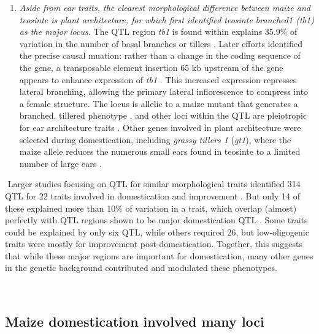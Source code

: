 \documentclass[9pt,twocolumn,twoside]{rilabRxiv}
\begin{document}
\begin{enumerate}
﻿ \item \textit{Aside from ear traits, the clearest morphological difference between maize and teosinte is plant architecture, for which
 \citet{doebley1995} first identified \textit{teosinte branched1} (\textit{tb1}) as the major locus. }
 The QTL region \textit{tb1} is found within explains 35.9\% of variation in the number of basal branches or tillers \citep{doebley1991}.
 Later efforts identified the precise causal muation: rather than a change in the coding sequence of the gene, a transposable element insertion 65 kb upstream of the gene appears to enhance expression of \textit{tb1} \citep{studer2011}.
 This increased expression represses lateral branching, allowing the primary lateral inflorescence to compress into a female structure.
 The locus is allelic to a maize mutant that generates a branched, tillered phenotype \citep{burnham1959}, and other loci within the QTL are pleiotropic for ear architecture traits \citep{studer2011fract}.
 Other genes involved in plant architecture were selected during domestication, including \textit{grassy tillers 1} (\textit{gt1}), where the maize allele reduces the numerous small ears found in teosinte to a limited number of large ears \citep{wills2017}.


 \end{enumerate}

﻿
﻿Larger studies focusing on QTL for similar morphological traits identified 314 QTL for 22 traits involved in domestication and improvement \citep{briggs2007}.
But only 14 of these explained more than 10\% of variation in a trait, which overlap (almost) perfectly with QTL regions shown to be major domestication QTL \citep{doebley1993}.
Some traits could be explained by only six QTL, while others required 26, but low-oligogenic traits were mostly for improvement post-domestication.
﻿Together, this suggests that while these major regions are important for domestication, many other genes in the genetic background contributed and modulated these phenotypes.

﻿\subsection*{Maize domestication involved many loci}
\end{document}
